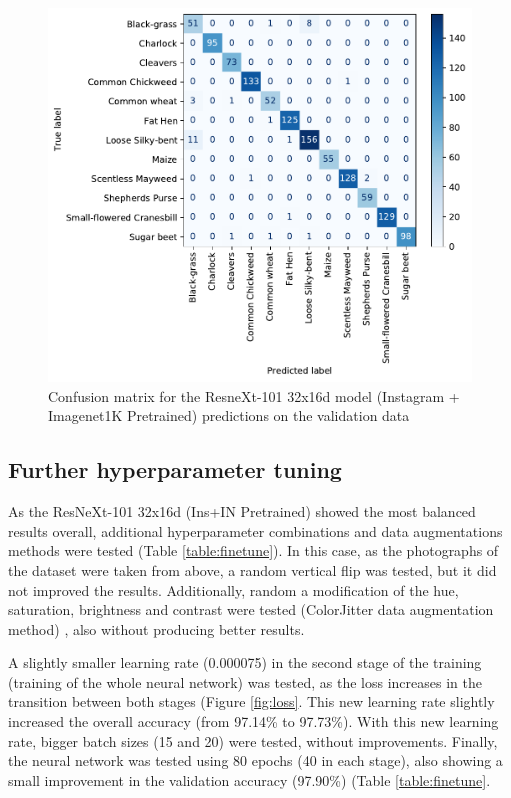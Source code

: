 \documentclass[10pt,onecolumn,titlepage,letterpaper]{article}
\begin{document}
\begin{figure}[h]
	\begin{center}
		\includegraphics[width=0.6\linewidth]{confusion_matrix.pdf}
	\end{center}
	\caption{Confusion matrix for the ResneXt-101 32x16d model (Instagram + Imagenet1K Pretrained) predictions on the validation data}
	\label{fig:cm}
\end{figure}

\subsection{Further hyperparameter tuning}

As the ResNeXt-101 32x16d (Ins+IN Pretrained) showed the most balanced results overall, additional hyperparameter combinations and data augmentations methods were tested (Table \ref{table:finetune}). In this case, as the photographs of the dataset were taken from above, a random vertical flip was tested, but it did not improved the results. Additionally, random a modification of the hue, saturation, brightness and contrast were tested (ColorJitter data augmentation method) \cite{Shorten2019}, also without producing better results.

A slightly smaller learning rate (0.000075) in the second stage of the training (training of the whole neural network) was tested, as the loss increases in the transition between both stages (Figure \ref{fig:loss}. This new learning rate slightly increased the overall accuracy (from 97.14\% to 97.73\%). With this new learning rate, bigger batch sizes (15 and 20) were tested, without improvements. Finally, the neural network was tested using 80 epochs (40 in each stage), also showing a small improvement in the validation accuracy (97.90\%) (Table \ref{table:finetune}.
\end{document}
